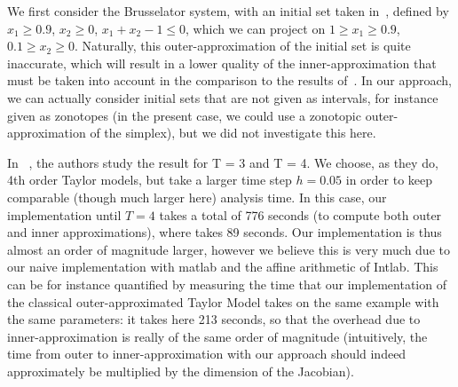 
We first consider the Brusselator system, with an initial set taken in~\cite{Underapproxflowpipes}, defined by 
$x_1 \geq 0.9$, $x_2 \geq 0$, $x_1+x_2-1 \leq 0$, which we can project on $1 \geq x_1 \geq 0.9$, $0.1 \geq x_2 \geq 0$.
Naturally, this outer-approximation of the initial set is quite inaccurate, which will result in a lower quality of the inner-approximation
that must be taken into account in the comparison to the results of~\cite{Underapproxflowpipes}. In our approach, 
we can actually consider initial sets that are not given as intervals, for instance given as zonotopes 
(in the present case, we could use a zonotopic outer-approximation of the simplex),  
but we did not investigate this here. 

In ~\cite{Underapproxflowpipes}, the authors study the result for T = 3 and T = 4. We choose, as they do, 4th order Taylor models, 
but take a larger time step $h=0.05$ in order to keep comparable (though much larger here) analysis time. In this case, our implementation until $T=4$
takes a total of 776 seconds (to compute both outer and inner approximations), where \cite{Underapproxflowpipes} takes 89 seconds.
Our implementation is thus almost an order of magnitude larger, however we believe this is very much due to our naive implementation 
with matlab and the affine arithmetic of Intlab. This can be for instance quantified by measuring the time  that our implementation of the classical 
outer-approximated Taylor Model takes on the same example with the same parameters: it takes here 213 seconds, so that the overhead due to inner-approximation 
is really of the same order of magnitude (intuitively, the time from outer to inner-approximation with our approach should indeed approximately 
be multiplied by the dimension of the Jacobian). 

